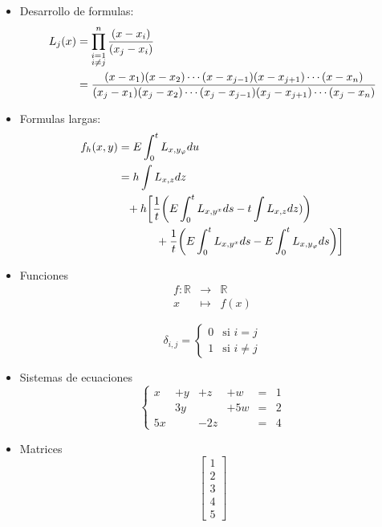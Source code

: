 \documentclass[a4,10pt]{aleph-notas}
\theoremstyle{definition}
\theoremstyle{plain}
\begin{document}
\begin{itemize}
\item Desarrollo de formulas:
\begin{align}
L_j(x)&=\prod_{\substack{i=1\\i\not=j}}^n\frac{(x-x_i)}{(x_j-x_i)}\\
  &=\frac{(x-x_1)(x-x_2)\cdots(x-x_{j-1})(x-x_{j+1})\cdots(x-x_n)}{(x_j-x_1)(x_j-x_2)\cdots(x_j-x_{j-1})(x_j-x_{j+1})\cdots(x_j-x_n)}\notag
\end{align}

\item Formulas largas:
\begin{align}
f_h (x,y)&=E\int_0^t L_{x,y_\varphi}du\notag\\
&= h\int L_{x, z} dz \notag\\
&\phantom{=} {} + h \biggl[ \frac 1 {t}\bigg( E \int_0^{t}  L_{x, y^x}ds- t\int L_{x,z}dz) \biggr)  \notag\\
&\phantom{= {} + h \biggl[} +\frac 1 {t}\bigg( E \int_0^{t}  L_{x, y^x} ds - E\int_0^t L_{x,y_\varphi} ds \biggr)\biggr]
\end{align}

\item Funciones
\begin{equation*}
\begin{array}{rcl}
f\colon \mathbb{R}&\longrightarrow&\mathbb{R}\\
x&\longmapsto&f(x)
\end{array}
\end{equation*}

\begin{equation*}
\delta_{i,j}=\begin{cases}
0&\text{si }i=j\\
1&\text{si }i\not=j
\end{cases}
\end{equation*}

\item Sistemas de ecuaciones
\begin{equation}
\left\{\begin{array}{cccccc}
x&+y&+z&+w&=&1\\
&3y&&+5w&=&2\\
5x&&-2z&&=&4
\end{array}\right.
\end{equation}

\item Matrices
\begin{equation*}
\begin{bmatrix}
1\\2\\3\\4\\5
\end{bmatrix}
\end{equation*}


\end{itemize}
\end{document}
